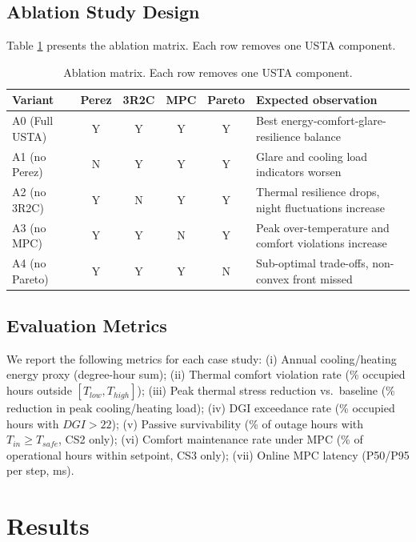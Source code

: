 \documentclass[preprint,12pt]{elsarticle}
\begin{document}
\subsection{Ablation Study Design}

Table \ref{tab:ablation-design} presents the ablation matrix. Each row removes one USTA component.

\begin{table}[htbp]
\centering
\caption{Ablation matrix. Each row removes one USTA component.}
\label{tab:ablation-design}
\begin{tabularx}{\textwidth}{@{} l c c c c >{\raggedright\arraybackslash}X @{}}
\toprule
\textbf{Variant} & \textbf{Perez} & \textbf{3R2C} & \textbf{MPC} & \textbf{Pareto} & \textbf{Expected observation} \\
\midrule
A0 (Full USTA) & Y & Y & Y & Y & Best energy-comfort-glare-resilience balance \\
A1 (no Perez) & N & Y & Y & Y & Glare and cooling load indicators worsen \\
A2 (no 3R2C) & Y & N & Y & Y & Thermal resilience drops, night fluctuations increase \\
A3 (no MPC) & Y & Y & N & Y & Peak over-temperature and comfort violations increase \\
A4 (no Pareto) & Y & Y & Y & N & Sub-optimal trade-offs, non-convex front missed \\
\bottomrule
\end{tabularx}
\end{table}

\subsection{Evaluation Metrics}

We report the following metrics for each case study: (i) Annual cooling/heating energy proxy (degree-hour sum); (ii) Thermal comfort violation rate (\% occupied hours outside $[T_{low}, T_{high}]$); (iii) Peak thermal stress reduction vs.\ baseline (\% reduction in peak cooling/heating load); (iv) DGI exceedance rate (\% occupied hours with $DGI > 22$); (v) Passive survivability (\% of outage hours with $T_{in} \geq T_{safe}$, CS2 only); (vi) Comfort maintenance rate under MPC (\% of operational hours within setpoint, CS3 only); (vii) Online MPC latency (P50/P95 per step, ms).

\section{Results}
\label{sec:results}
\end{document}
